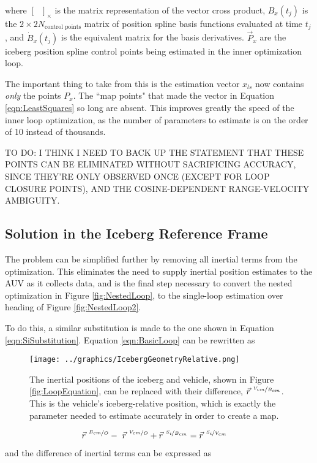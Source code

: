where $[~~~]_\times$ is the matrix representation of the vector cross product, $B_x(t_j)$ is the $2\times2N_\text{control points}$ matrix of position spline basis functions evaluated at time $t_j$, and $\dot{B}_x(t_j)$ is the equivalent matrix for the basis derivatives. $\vec{P}_x$ are the iceberg position spline control points being estimated in the inner optimization loop.

The important thing to take from this is the estimation vector $x_{ls}$ now contains \emph{only} the points $P_x$. The ``map points" that made the vector in Equation \ref{eqn:LeastSquares} so long are absent. This improves greatly the speed of the inner loop optimization, as the number of parameters to estimate is on the order of 10 instead of thousands.

TO DO: I THINK I NEED TO BACK UP THE STATEMENT THAT THESE POINTS CAN BE ELIMINATED WITHOUT SACRIFICING ACCURACY, SINCE THEY'RE ONLY OBSERVED ONCE (EXCEPT FOR LOOP CLOSURE POINTS), AND THE COSINE-DEPENDENT RANGE-VELOCITY AMBIGUITY.

\subsection{Solution in the Iceberg Reference Frame}
\label{sec.MainContrib}
The problem can be simplified further by removing all inertial terms from the optimization. This eliminates the need to supply inertial position estimates to the AUV as it collects data, and is the final step necessary to convert the nested optimization in Figure \ref{fig:NestedLoop}, to the single-loop estimation over heading of Figure \ref{fig:NestedLoop2}. 

To do this, a similar substitution is made to the one shown in Equation \ref{eqn:SiSubstitution}. Equation \ref{eqn:BasicLoop} can be rewritten as

\begin{figure}[htbp]
   \centering
   \texttt{[image: ../graphics/IcebergGeometryRelative.png]} %
   \caption{The inertial positions of the iceberg and vehicle, shown in Figure \ref{fig:LoopEquation}, can be replaced with their difference, $ \vec{r}^{~\nicefrac{V_{cm}}{B_{cm}}}$. This is the vehicle's iceberg-relative position, which is exactly the parameter needed to estimate accurately in order to create a map. }
    \label{fig:LoopEquationBergFrame}
\end{figure}

\begin{align}
\vec{r}^{~\nicefrac{B_{cm}}{O}}  - ~\vec{r}^{~\nicefrac{V_{cm}}{O}} + \vec{r}^{~\nicefrac{S_i}{B_{cm}}} &= \vec{r}^{~\nicefrac{S_i}{V_{cm}}}
\label{eqn:Loop2}
\end{align}
and the difference of inertial terms can be expressed as 

